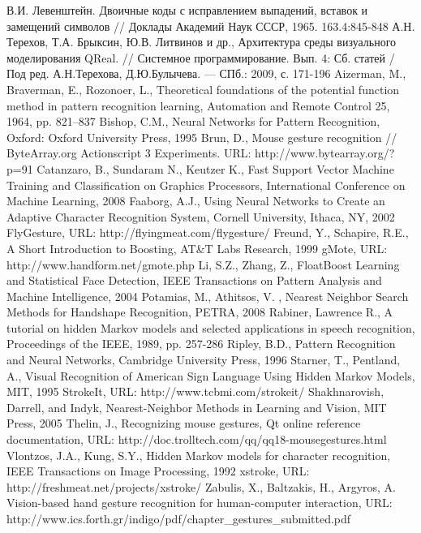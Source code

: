 \documentclass[a5paper]{article}
\begin{document}
\begin{thebibliography}{9001}
   В.И. Левенштейн. Двоичные коды с исправлением выпадений, вставок и замещений символов // Доклады Академий Наук СССР, 1965. 163.4:845-848
   А.Н. Терехов, Т.А. Брыксин, Ю.В. Литвинов и др., Архитектура среды визуального моделирования QReal. // Системное 
программирование. Вып. 4: Сб. статей / Под ред. А.Н.Терехова, Д.Ю.Булычева. --- СПб.: 2009, с. 171-196
   Aizerman, M., Braverman, E., Rozonoer, L., Theoretical foundations of the potential function method in pattern recognition learning, 
Automation and Remote Control 25, 1964, pp. 821–837
   Bishop, C.M., Neural Networks for Pattern Recognition, Oxford: Oxford University Press, 1995  
   Brun, D., Mouse gesture recognition // ByteArray.org Actionscript 3 Experiments. URL: http://www.bytearray.org/?p=91 
   Catanzaro, B., Sundaram N., Keutzer K., Fast Support Vector Machine Training and Classification on Graphics Processors, International 
Conference on Machine Learning, 2008
   Faaborg, A.J., Using Neural Networks to Create an Adaptive Character Recognition System, Cornell University, Ithaca, NY, 2002
   FlyGesture, URL: http://flyingmeat.com/flygesture/
   Freund, Y., Schapire, R.E., A Short Introduction to Boosting, AT\&T Labs Research, 1999
   gMote, URL: http://www.handform.net/gmote.php
   Li, S.Z., Zhang, Z., FloatBoost Learning and Statistical Face Detection, IEEE Transactions on Pattern Analysis and Machine Intelligence, 2004
   Potamias, M., Athitsos, V. , Nearest Neighbor Search Methods for Handshape Recognition, PETRA, 2008
   Rabiner, Lawrence R., A tutorial on hidden Markov models and selected applications in speech recognition, Proceedings of the IEEE, 1989, pp. 257-286
   Ripley, B.D., Pattern Recognition and Neural Networks, Cambridge University Press, 1996
   Starner, T., Pentland, A., Visual Recognition of American Sign Language Using Hidden Markov Models, MIT, 1995
   StrokeIt, URL: http://www.tcbmi.com/strokeit/  
   Shakhnarovish, Darrell, and Indyk, Nearest-Neighbor Methods in Learning and Vision, MIT Press, 2005
   Thelin, J., Recognizing mouse gestures, Qt online reference documentation, URL: http://doc.trolltech.com/qq/qq18-mousegestures.html 
   Vlontzos, J.A., Kung, S.Y., Hidden Markov models for character recognition, IEEE Transactions on Image Processing, 1992
   xstroke, URL: http://freshmeat.net/projects/xstroke/
   Zabulis, X., Baltzakis, H., Argyros, A. Vision-based hand gesture recognition for human-computer interaction, URL: http://www.ics.forth.gr/indigo/pdf/chapter\_gestures\_submitted.pdf
\end{thebibliography}
  
\end{document}
